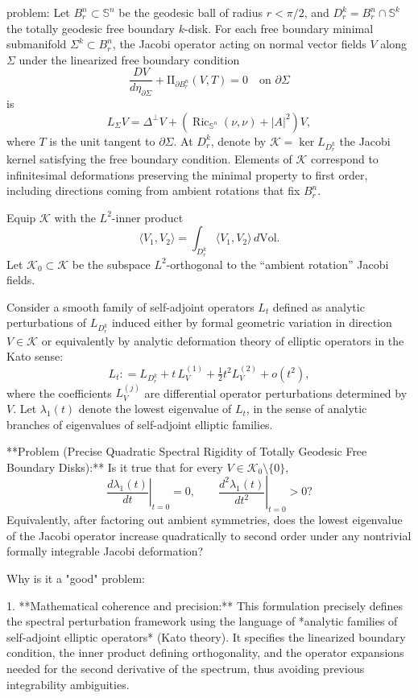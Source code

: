 problem:  
Let \(B_r^n \subset \mathbb{S}^n\) be the geodesic ball of radius \(r<\pi/2\), and \(D_r^k = B_r^n \cap \mathbb{S}^k\) the totally geodesic free boundary \(k\)-disk.   
For each free boundary minimal submanifold \(\Sigma^k\subset B_r^n\), the Jacobi operator acting on normal vector fields \(V\) along \(\Sigma\) under the linearized free boundary condition
\[
\frac{D V}{d\eta_{\partial \Sigma}} + \mathrm{II}_{\partial B_r^n}(V,T) = 0 \quad\text{on } \partial\Sigma
\]
is
\[
L_\Sigma V = \Delta^\perp V + (\operatorname{Ric}_{\mathbb{S}^n}(\nu,\nu) + |A|^2)V,
\]
where \(T\) is the unit tangent to \(\partial\Sigma\).  
At \(D_r^k\), denote by \(\mathcal{K} = \ker L_{D_r^k}\) the Jacobi kernel satisfying the free boundary condition.  
Elements of \(\mathcal{K}\) correspond to infinitesimal deformations preserving the minimal property to first order, including directions coming from ambient rotations that fix \(B_r^n\).

Equip \(\mathcal{K}\) with the \(L^2\)-inner product
\[
\langle V_1, V_2\rangle = \int_{D_r^k} \langle V_1, V_2\rangle\, d\mathrm{Vol}.
\]
Let \(\mathcal{K}_0 \subset \mathcal{K}\) be the subspace \(L^2\)-orthogonal to the “ambient rotation” Jacobi fields.

Consider a smooth family of self-adjoint operators \(L_t\) defined as analytic perturbations of \(L_{D_r^k}\) induced either by formal geometric variation in direction \(V \in \mathcal{K}\) or equivalently by analytic deformation theory of elliptic operators in the Kato sense:
\[
L_t : = L_{D_r^k} + t\, L^{(1)}_V + \tfrac12 t^2 L^{(2)}_V + o(t^2),
\]
where the coefficients \(L^{(j)}_V\) are differential operator perturbations determined by \(V\).  
Let \(\lambda_1(t)\) denote the lowest eigenvalue of \(L_t\), in the sense of analytic branches of eigenvalues of self-adjoint elliptic families.

**Problem (Precise Quadratic Spectral Rigidity of Totally Geodesic Free Boundary Disks):**  
Is it true that for every \(V\in \mathcal{K}_0 \setminus \{0\}\),
\[
\left.\frac{d\lambda_1(t)}{dt}\right|_{t=0}=0, \qquad 
\left.\frac{d^2\lambda_1(t)}{dt^2}\right|_{t=0}>0 ?
\]
Equivalently, after factoring out ambient symmetries, does the lowest eigenvalue of the Jacobi operator increase quadratically to second order under any nontrivial formally integrable Jacobi deformation?

Why is it a "good" problem:  

1. **Mathematical coherence and precision:**  
   This formulation precisely defines the spectral perturbation framework using the language of *analytic families of self-adjoint elliptic operators* (Kato theory). It specifies the linearized boundary condition, the inner product defining orthogonality, and the operator expansions needed for the second derivative of the spectrum, thus avoiding previous integrability ambiguities.

